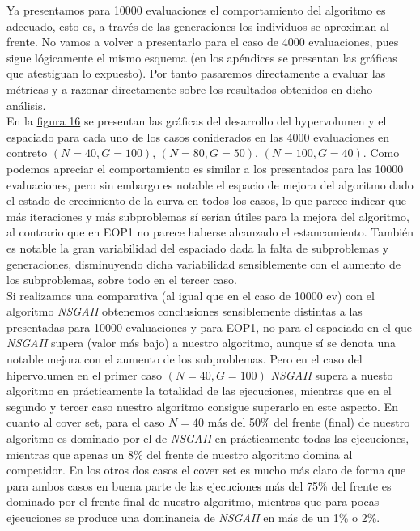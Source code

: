 Ya presentamos para 10000 evaluaciones el comportamiento del algoritmo es adecuado, esto es, a través de las generaciones los individuos se aproximan al frente. No vamos a volver a presentarlo para el caso de 4000 evaluaciones, pues sigue lógicamente el mismo esquema (en los apéndices se presentan las gráficas que atestiguan lo expuesto). Por tanto pasaremos directamente a evaluar las métricas y a razonar directamente sobre los resultados obtenidos en dicho análisis.  \\

En la \hyperref[fig:16]{figura 16} se presentan las gráficas del desarrollo del hypervolumen y el espaciado para cada uno de los casos coniderados en las 4000 evaluaciones en contreto $(N=40, G=100)$, $(N=80, G=50)$, $(N=100, G=40)$. Como podemos apreciar el comportamiento es similar a los presentados para las 10000 evaluaciones, pero sin embargo es notable el espacio de mejora del algoritmo dado el estado de crecimiento de la curva en todos los casos, lo que parece indicar que más iteraciones y más subproblemas sí serían útiles para la mejora del algoritmo, al contrario que en EOP1 no parece haberse alcanzado el estancamiento. También es notable la gran variabilidad del espaciado dada la falta de subproblemas y generaciones, disminuyendo dicha variabilidad sensiblemente con el aumento de los subproblemas, sobre todo en el tercer caso.\\

Si realizamos una comparativa (al igual que en el caso de 10000 ev) con el algoritmo \textit{NSGAII} obtenemos conclusiones sensiblemente distintas a las presentadas para 10000 evaluaciones y para EOP1, no para el espaciado en el que \textit{NSGAII} supera (valor más bajo) a nuestro algoritmo, aunque sí se denota una notable mejora con el aumento de los subproblemas. Pero en el caso del hipervolumen en el primer caso $(N=40, G=100)$ \textit{NSGAII} supera a nuesto algoritmo en prácticamente la totalidad de las ejecuciones, mientras que en el segundo y tercer caso nuestro algoritmo consigue superarlo en este aspecto. En cuanto al cover set, para el caso $N=40$ más del 50\%   del frente (final) de nuestro algoritmo es dominado por el de \textit{NSGAII} en prácticamente todas las ejecuciones, mientras que apenas un 8\% del frente de nuestro algoritmo domina al competidor. En los otros dos casos el cover set es mucho más claro de forma que para ambos casos en buena parte de las ejecuciones más del 75\% del frente es dominado por el frente final de nuestro algoritmo, mientras que para pocas ejecuciones se produce una dominancia de \textit{NSGAII} en más de un 1\% o 2\%.\\

